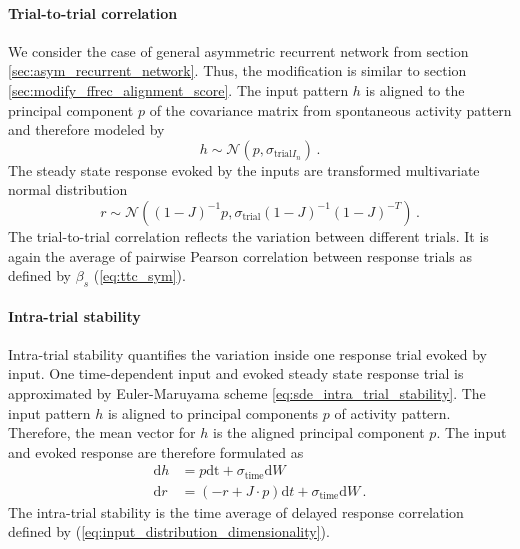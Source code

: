 \documentclass[11pt]{article}
\begin{document}
	\paragraph{Trial-to-trial correlation} We consider the case of general asymmetric recurrent network from section \ref{sec:asym_recurrent_network}. Thus, the modification is similar to section \ref{sec:modify_ffrec_alignment_score}. The input pattern $h$ is aligned to the principal component $p$ of the covariance matrix from spontaneous activity pattern and therefore modeled by
		\begin{equation}
			h \sim \mathcal{N}(p, \sigma_{\text{trial}I_n}) \, .
		\end{equation}
	The steady state response evoked by the inputs are transformed multivariate normal distribution
		\begin{equation}
			r \sim \mathcal{N}\left((1-J)^{-1}p, \sigma_{\text{trial}} (1-J)^{-1} (1-J)^{-T}\right) \, .
		\end{equation}
	The trial-to-trial correlation reflects the variation between different trials. It is again the average of pairwise Pearson correlation between response trials as defined by $\beta_s$ (\ref{eq:ttc_sym}). 
	
	\paragraph{Intra-trial stability} Intra-trial stability quantifies the variation inside one response trial evoked by input. One time-dependent input and evoked steady state response trial is approximated by Euler-Maruyama scheme \ref{eq:sde_intra_trial_stability}. The input pattern $h$ is aligned to principal components $p$ of activity pattern. Therefore, the mean vector for $h$ is the aligned principal component $p$. The input and evoked response are therefore formulated as
		\begin{subequations}
			\begin{align}
				\mathrm{d} h & = p \mathrm{dt} + \sigma_{\text{time}} \mathrm{d} W \\
				\mathrm{d} r & = (-r + J \cdot p) \mathrm{d}t + \sigma_{\text{time}} \mathrm{d} W \, .
			\end{align}
		\end{subequations}
	The intra-trial stability is the time average of delayed response correlation defined by (\ref{eq:input_distribution_dimensionality}). 
	
\end{document}
